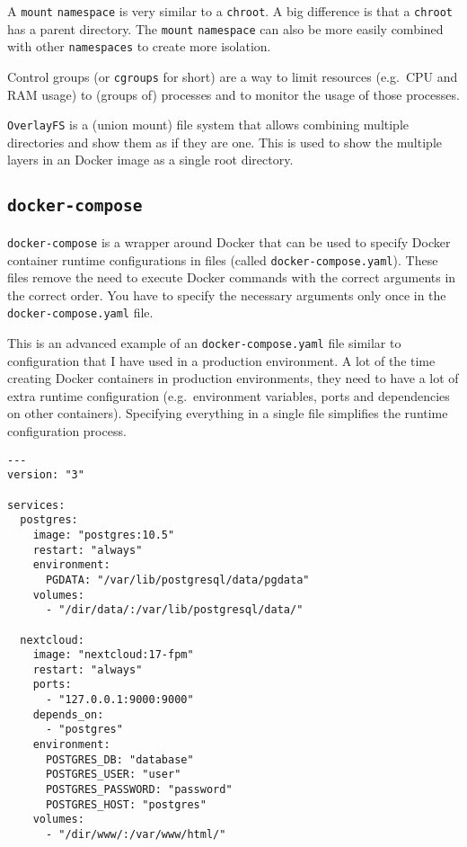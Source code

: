 A \lstinline{mount} \lstinline{namespace} is very similar to a \lstinline{chroot}. A big difference is that a \lstinline{chroot} has a parent directory. The \lstinline{mount} \lstinline{namespace} can also be more easily combined with other \lstinline{namespaces} to create more isolation.

\hfill

Control groups (or \lstinline{cgroups} for short) are a way to limit resources (e.g.\ CPU and RAM usage) to (groups of) processes and to monitor the usage of those processes.

\hfill

\lstinline{OverlayFS} is a (union mount) file system that allows combining multiple directories and show them as if they are one. This is used to show the multiple layers in an Docker image as a single root directory.


\subsection{\texorpdfstring{\lstinline{docker-compose}}{docker-compose}}
\lstinline{docker-compose} is a wrapper around Docker that can be used to specify Docker container runtime configurations in files (called \lstinline{docker-compose.yaml}). These files remove the need to execute Docker commands with the correct arguments in the correct order. You have to specify the necessary arguments only once in the \lstinline{docker-compose.yaml} file.

\hfill

This is an advanced example of an \lstinline{docker-compose.yaml} file similar to configuration that I have used in a production environment. A lot of the time creating Docker containers in production environments, they need to have a lot of extra runtime configuration (e.g.\ environment variables, ports and dependencies on other containers). Specifying everything in a single file simplifies the runtime configuration process.
\begin{lstlisting}[caption={Example \lstinline{docker-compose.yaml}},label={listing:docker-compose-file},captionpos=b]
---
version: "3"

services:
  postgres:
    image: "postgres:10.5"
    restart: "always"
    environment:
      PGDATA: "/var/lib/postgresql/data/pgdata"
    volumes:
      - "/dir/data/:/var/lib/postgresql/data/"

  nextcloud:
    image: "nextcloud:17-fpm"
    restart: "always"
    ports:
      - "127.0.0.1:9000:9000"
    depends_on:
      - "postgres"
    environment:
      POSTGRES_DB: "database"
      POSTGRES_USER: "user"
      POSTGRES_PASSWORD: "password"
      POSTGRES_HOST: "postgres"
    volumes:
      - "/dir/www/:/var/www/html/"
\end{lstlisting}

